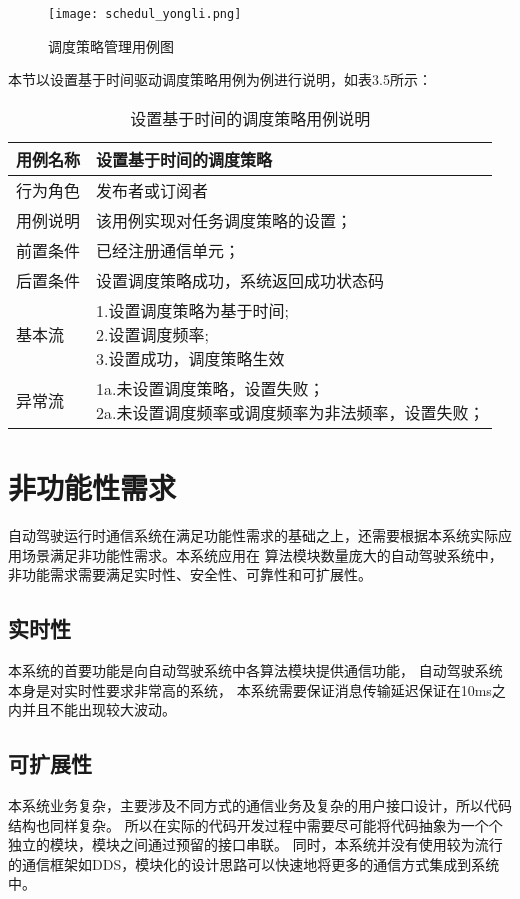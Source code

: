\begin{figure}[H]
  \centering
  \texttt{[image: schedul\_yongli.png]}
  \caption{调度策略管理用例图}
  \label{schedul_yongli}
\end{figure}

本节以设置基于时间驱动调度策略用例为例进行说明，如表3.5所示：
\begin{table}[H]
  \centering\small
  \caption{设置基于时间的调度策略用例说明}
  \label{tab:exampletable}
  \begin{tabular}{ll}
    \toprule
    \multicolumn{1}{l}{用例名称} & \multicolumn{1}{l}{设置基于时间的调度策略}  \\
    \midrule
    行为角色 & 发布者或订阅者\\
    用例说明 & 该用例实现对任务调度策略的设置；\\
    前置条件 & 已经注册通信单元；\\
    后置条件 & 设置调度策略成功，系统返回成功状态码\\
    基本流   & \makecell[l]{1.设置调度策略为基于时间;\\2.设置调度频率;\\3.设置成功，调度策略生效}\\
    异常流   & \makecell[l]{1a.未设置调度策略，设置失败；\\2a.未设置调度频率或调度频率为非法频率，设置失败；}\\
    \bottomrule
  \end{tabular}
\end{table}

\section{非功能性需求}
自动驾驶运行时通信系统在满足功能性需求的基础之上，还需要根据本系统实际应用场景满足非功能性需求。本系统应用在
算法模块数量庞大的自动驾驶系统中，非功能需求需要满足实时性、安全性、可靠性和可扩展性。

\subsection{实时性}
本系统的首要功能是向自动驾驶系统中各算法模块提供通信功能，
自动驾驶系统本身是对实时性要求非常高的系统，
本系统需要保证消息传输延迟保证在10ms之内并且不能出现较大波动。

\subsection{可扩展性}
本系统业务复杂，主要涉及不同方式的通信业务及复杂的用户接口设计，所以代码结构也同样复杂。
所以在实际的代码开发过程中需要尽可能将代码抽象为一个个独立的模块，模块之间通过预留的接口串联。
同时，本系统并没有使用较为流行的通信框架如DDS，模块化的设计思路可以快速地将更多的通信方式集成到系统中。

